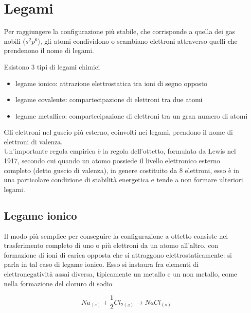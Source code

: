 \chapter{Legami}

Per raggiungere la configurazione più stabile, che corrisponde a quella dei gas nobili ($s^2p^6$), gli atomi condividono o scambiano elettroni attraverso quelli che prendenono il nome di legami. 

Esistono 3 tipi di legami chimici

\begin{itemize}
    \item legame ionico: attrazione elettrostatica tra ioni di segno opposto
    \item legame covalente: compartecipazione di elettroni tra due atomi 
    \item legame metallico: compartecipazione di elettroni tra un gran numero di atomi
\end{itemize}

Gli elettroni nel guscio più esterno, coinvolti nei legami, prendono il nome di elettroni di valenza.\\

Un'importante regola empirica è la regola dell'ottetto, formulata da Lewis nel 1917, secondo cui quando un atomo possiede il livello elettronico esterno completo (detto guscio di valenza), in genere costituito da 8 elettroni, esso è in una particolare condizione di stabilità energetica e tende a non formare ulteriori legami. 

\section{Legame ionico}

Il modo più semplice per conseguire la configurazione a ottetto consiste nel trasferimento completo di uno o più elettroni da un atomo all'altro, con formazione di ioni di carica opposta che si attraggono elettrostaticamente: si parla in tal caso di legame ionico. 
Esso si instaura fra elementi di elettronegatività assai diversa, tipicamente un metallo e un non metallo, come nella formazione del cloruro di sodio

\begin{equation}
    Na_{(s)} + \frac{1}{2} Cl_{2(g)} \longrightarrow NaCl_{(s)}
    \label{eq:formazione_nacl}
\end{equation}

